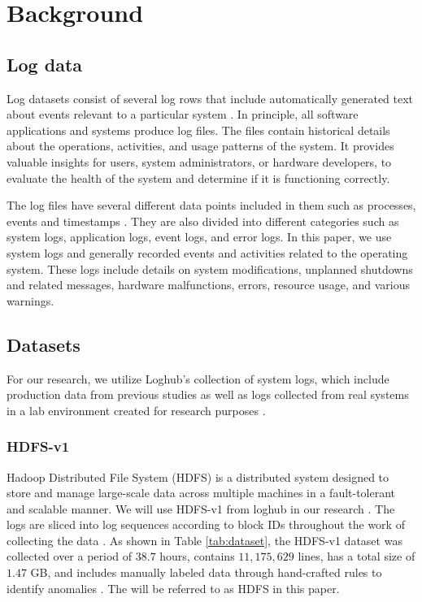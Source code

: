 
\chapter{Background}
\label{cha:background}

\section{Log data}
\label{logdata}
Log datasets consist of several log rows that include automatically generated text about events relevant to a particular system \cite{techtargetlogfile}. In principle, all software applications and systems produce log files. The files contain historical details about the operations, activities, and usage patterns of the system. It provides valuable insights for users, system administrators, or hardware developers, to evaluate the health of the system and determine if it is functioning correctly.

The log files have several different data points included in them such as processes, events and timestamps \cite{techtargetlogfile}. They are also divided into different categories such as system logs, application logs, event logs, and error logs. In this paper, we use system logs and generally recorded events and activities related to the operating system. These logs include details on system modifications, unplanned shutdowns and related messages, hardware malfunctions, errors, resource usage, and various warnings. 

\section{Datasets}
\label{Datasets}
For our research, we utilize Loghub's collection of system logs, which include production data from previous studies as well as logs collected from real systems in a lab environment created for research purposes \cite{zhu2023loghublargecollectionlog}.

\subsection{HDFS-v1}
Hadoop Distributed File System (HDFS) is a distributed system designed to store and manage large-scale data across multiple machines in a fault-tolerant and scalable manner. We will use HDFS-v1 from loghub in our research \cite{zhu2023loghublargecollectionlog}. The logs are sliced into log sequences according to block IDs throughout the work of collecting the data \cite{Wei2010consolelogs}. As shown in Table \ref{tab:dataset}, the HDFS-v1 dataset was collected over a period of $38.7$ hours, contains $11,175,629$ lines, has a total size of $1.47$ GB, and includes manually labeled data through hand-crafted rules to identify anomalies \cite{zhu2023loghublargecollectionlog}. The  will be referred to as HDFS in this paper. 

